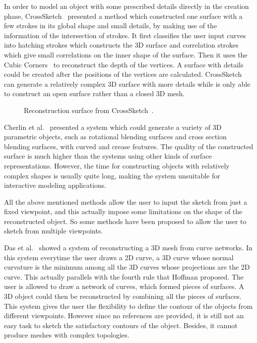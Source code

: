 In order to model an object with some prescribed details directly in the creation phase, CrossSketch~\cite{ASN07} presented a method which constructed one surface with a few strokes in its global shape and small details, by making use of the information of the intersection of strokes. It first classifies the user input curves into hatching strokes which constructs the 3D surface and correlation strokes which give small correlations on the inner shape of the surface. Then it uses the Cubic Corners~\cite{DP1968} to reconstruct the depth of the vertices. A surface with details could be created after the positions of the vertices are calculated. CrossSketch can generate a relatively complex 3D surface with more details while is only able to construct an open surface rather than a closed 3D mesh.

\begin{figure} [htbp]
\renewcommand{\thesubfigure}{}
  \centering
  \caption{Reconstruction surface from CrossSketch~\cite{ASN07}.}
  \label{fig:CrossSketch} %
\end{figure}

Cherlin et al.~\cite{CSSJ05} presented a system which could generate a variety of 3D parametric objects, such as rotational blending surfaces and cross section blending surfaces, with curved and crease features. The quality of the constructed surface is much higher than the systems using other kinds of surface representations. However, the time for constructing objects with relatively complex shapes is usually quite long, making the system unsuitable for interactive modeling applications.

All the above mentioned methods allow the user to input the sketch from just a fixed viewpoint, and this actually impose some limitations on the shape of the reconstructed object. So some methods have been proposed to allow the user to sketch from multiple viewpoints.

Das et al.~\cite{KPG05} showed a system of reconstructing a 3D mesh from curve networks. In this system everytime the user draws a 2D curve, a 3D curve whose normal curvature is the minimum among all the 3D curves whose projections are the 2D curve. This actually parallels with the fourth rule that Hoffman proposed. The user is allowed to draw a network of curves, which formed pieces of surfaces. A 3D object could then be reconstructed by combining all the pieces of surfaces. This system gives the user the flexibility to define the contour of the objects from different viewpoints. However since no references are provided, it is still not an easy task to sketch the satisfactory contours of the object. Besides, it cannot produce meshes with complex topologies.


